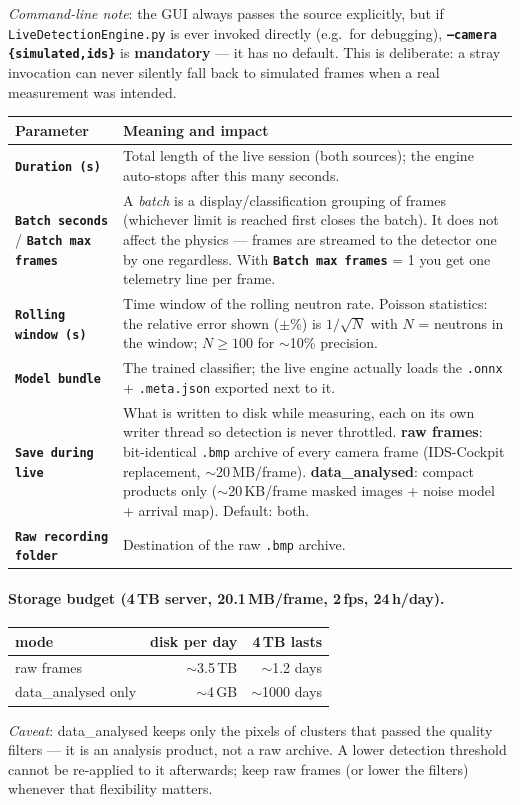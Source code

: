 \documentclass[11pt,a4paper]{article}
\newcommand{\param}[1]{\texttt{\textbf{#1}}}
\begin{document}
\emph{Command-line note}: the GUI always passes the source explicitly, but
if \texttt{LiveDetectionEngine.py} is ever invoked directly (e.g.\ for
debugging), \param{--camera \{simulated,ids\}} is \textbf{mandatory} --- it
has no default. This is deliberate: a stray invocation can never silently
fall back to simulated frames when a real measurement was intended.
\begin{longtable}{p{4.2cm}p{10.5cm}}
\toprule
\textbf{Parameter} & \textbf{Meaning and impact} \\
\midrule
\param{Duration (s)} & Total length of the live session (both sources); the
engine auto-stops after this many seconds. \\
\param{Batch seconds} / \param{Batch max frames} &
A \emph{batch} is a display/classification grouping of frames (whichever
limit is reached first closes the batch). It does not affect the physics ---
frames are streamed to the detector one by one regardless. With
\param{Batch max frames} = 1 you get one telemetry line per frame. \\
\param{Rolling window (s)} &
Time window of the rolling neutron rate. Poisson statistics: the relative
error shown ($\pm$\%) is $1/\sqrt{N}$ with $N$ = neutrons in the window;
$N \geq 100$ for $\sim$10\% precision. \\
\param{Model bundle} &
The trained classifier; the live engine actually loads the
\texttt{.onnx} + \texttt{.meta.json} exported next to it. \\
\param{Save during live} &
What is written to disk while measuring, each on its own writer thread so
detection is never throttled. \textbf{raw frames}: bit-identical
\texttt{.bmp} archive of every camera frame (IDS-Cockpit replacement,
$\sim$20\,MB/frame). \textbf{data\_analysed}: compact products only
($\sim$20\,KB/frame masked images + noise model + arrival map). Default:
both. \\
\param{Raw recording folder} & Destination of the raw \texttt{.bmp} archive. \\
\bottomrule
\end{longtable}

\paragraph{Storage budget (4\,TB server, 20.1\,MB/frame, 2\,fps, 24\,h/day).}
\begin{center}
\begin{tabular}{lrr}
\toprule
mode & disk per day & 4\,TB lasts \\
\midrule
raw frames            & $\sim$3.5\,TB & $\sim$1.2 days \\
data\_analysed only   & $\sim$4\,GB   & $\sim$1000 days \\
\bottomrule
\end{tabular}
\end{center}
\emph{Caveat}: data\_analysed keeps only the pixels of clusters that passed
the quality filters — it is an analysis product, not a raw archive. A
lower detection threshold cannot be re-applied to it afterwards; keep raw
frames (or lower the filters) whenever that flexibility matters.
\end{document}
